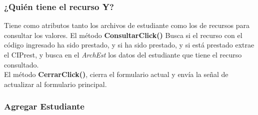 \documentclass[12pt]{article}
\begin{document}
\subsubsection{¿Quién tiene el recurso Y?}

Tiene como atributos tanto los archivos de estudiante como los de recursos para consultar los valores.  
El método \textbf{ConsultarClick()} Busca si el recurso con el código ingresado ha sido prestado, y si ha sido prestado, y si está prestado extrae el CIPrest, y busca en el \textit{ArchEst} los datos del estudiante que tiene el recurso consultado.  \\
El método \textbf{CerrarClick()}, cierra el formulario actual y envía la señal de actualizar al formulario principal.  

\subsubsection{Agregar Estudiante}

\end{document}
